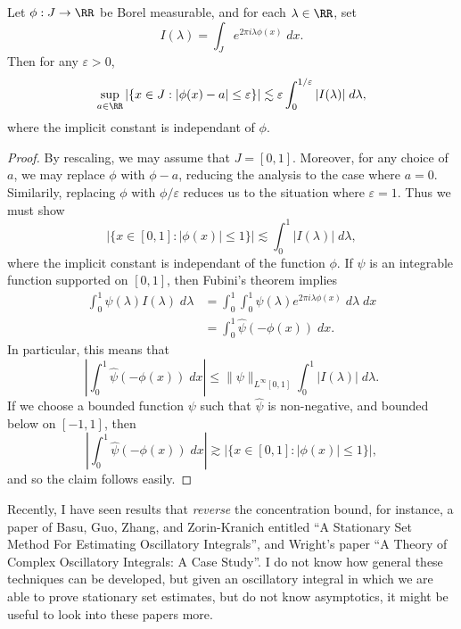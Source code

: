 \begin{theorem}
  Let $\phi: J \to \RR$ be Borel measurable, and for each $\lambda \in \RR$, set
  \[ I(\lambda) = \int_J e^{2 \pi i \lambda \phi(x)}\; dx. \]
  Then for any $\varepsilon > 0$,
  \[ \sup_{a \in \RR} |\{ x \in J: |\phi(x) - a| \leq \varepsilon \}| \lesssim \varepsilon \int_0^{1/\varepsilon} |I(\lambda)|\; d\lambda, \]
  where the implicit constant is independant of $\phi$.
\end{theorem}
\begin{proof}
  By rescaling, we may assume that $J = [0,1]$. Moreover, for any choice of $a$, we may replace $\phi$ with $\phi - a$, reducing the analysis to the case where $a = 0$. Similarily, replacing $\phi$ with $\phi/\varepsilon$ reduces us to the situation where $\varepsilon = 1$. Thus we must show
  \[ |\{ x \in [0,1]: |\phi(x)| \leq 1 \}| \lesssim \int_0^1 |I(\lambda)|\; d\lambda, \]
  where the implicit constant is independant of the function $\phi$. If $\psi$ is an integrable function supported on $[0,1]$, then Fubini's theorem implies
  \begin{align*}
    \int_0^1 \psi(\lambda) I(\lambda)\; d\lambda &= \int_0^1 \int_0^1 \psi(\lambda) e^{2 \pi i \lambda \phi(x)}\; d\lambda\; dx\\
    &= \int_0^1 \widehat{\psi}(- \phi(x))\; dx.
  \end{align*}
  In particular, this means that
  \[ \left| \int_0^1 \widehat{\psi}(- \phi(x))\; dx \right| \leq \| \psi \|_{L^\infty[0,1]} \int_0^1 |I(\lambda)|\; d\lambda. \]
  If we choose a bounded function $\psi$ such that $\widehat{\psi}$ is non-negative, and bounded below on $[-1,1]$, then
  \[ \left| \int_0^1 \widehat{\psi}(- \phi(x))\; dx \right| \gtrsim |\{ x \in [0,1]: |\phi(x)| \leq 1 \}|, \]
  and so the claim follows easily.
\end{proof}

\begin{remark}
    Recently, I have seen results that \emph{reverse} the concentration bound, for instance, a paper of Basu, Guo, Zhang, and Zorin-Kranich entitled ``A Stationary Set Method For Estimating Oscillatory Integrals'', and Wright's paper ``A Theory of Complex Oscillatory Integrals: A Case Study''. I do not know how general these techniques can be developed, but given an oscillatory integral in which we are able to prove stationary set estimates, but do not know asymptotics, it might be useful to look into these papers more.
\end{remark}


